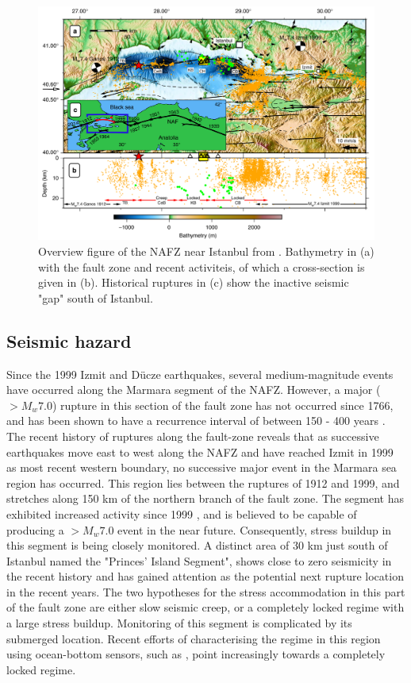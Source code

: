 \documentclass[../Text/00main.tex]{subfiles}
\begin{document}
 \begin{figure}
     \centering
     \includegraphics[width=.9\linewidth]{images_methods/bonhoff_integrative.png}
     \caption{Overview figure of the NAFZ near Istanbul from \cite{bohnhoff_maximum_2016}. Bathymetry in (a) with the fault zone and recent activiteis, of which a cross-section is given in (b). Historical ruptures in (c) show the inactive seismic "gap" south of Istanbul.}
     \label{fig:bonhoffintegrative}
 \end{figure}

\subsection{Seismic hazard}

Since the 1999 Izmit and Dücze earthquakes, several medium-magnitude events have occurred along the Marmara segment of the NAFZ. However, a major ($> M_w 7.0$) rupture in this section of the fault zone has not occurred since 1766, and has been shown to have a recurrence interval of between 150 - 400 years \citep{ambraseys2002seismic}. The recent history of ruptures along the fault-zone reveals that as successive earthquakes move east to west along the NAFZ and have reached Izmit in 1999 as most recent western boundary, no successive major event in the Marmara sea region has occurred. This region lies between the ruptures of 1912 and 1999, and stretches along 150 km of the northern branch of the fault zone. The segment has exhibited increased activity since 1999 \citep{bohnhoff_earthquake_2013}, and is believed to be capable of producing a $> M_w 7.0$ event in the near future. Consequently, stress buildup in this segment is being closely monitored. A distinct area of 30 km just south of Istanbul named the "Princes' Island Segment", shows close to zero seismicity in the recent history \citep{bohnhoff_earthquake_2013} and has gained attention as the potential next rupture location in the recent years. The two hypotheses for the stress accommodation in this part of the fault zone are either slow seismic creep, or a completely locked regime with a large stress buildup. Monitoring of this segment is complicated by its submerged location. Recent efforts of characterising the regime in this region using ocean-bottom sensors, such as \citet{lange2019interseismic}, point increasingly towards a completely locked regime.
\end{document}
